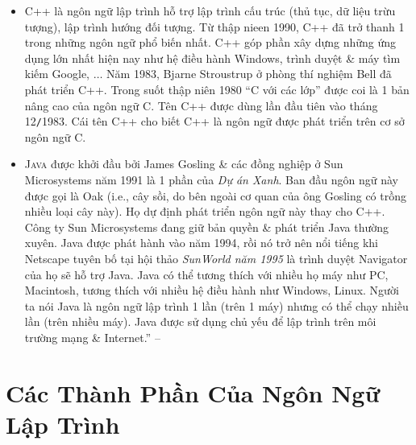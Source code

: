 \documentclass[oneside]{book}
\numberwithin{equation}{section}
\begin{document}
\begin{itemize}
	\item C++ là ngôn ngữ lập trình hỗ trợ lập trình cấu trúc (thủ tục, dữ liệu trừu tượng), lập trình hướng đối tượng. Từ thập nieen 1990, C++ đã trở thanh 1 trong những ngôn ngữ phổ biến nhất. C++ góp phần xây dựng những ứng dụng lớn nhất hiện nay như hệ điều hành Windows, trình duyệt \& máy tìm kiếm Google, $\ldots$ Năm 1983, Bjarne Stroustrup ở phòng thí nghiệm Bell đã phát triển C++. Trong suốt thập niên 1980 ``C với các lớp'' được coi là 1 bản nâng cao của ngôn ngữ C. Tên C++ được dùng lần đầu tiên vào tháng 12\texttt{/}1983. Cái tên C++ cho biết C++ là ngôn ngữ được phát triển trên cơ sở ngôn ngữ C.
	\item \textsc{Java} được khởi đầu bởi James Gosling \& các đồng nghiệp ở Sun Microsystems năm 1991 là 1 phần của \textit{Dự án Xanh}. Ban đầu ngôn ngữ này được gọi là Oak (i.e., cây sồi, do bên ngoài cơ quan của ông Gosling có trồng nhiều loại cây này). Họ dự định phát triển ngôn ngữ này thay cho C++. Công ty Sun Microsystems đang giữ bản quyền \& phát triển Java thường xuyên. Java được phát hành vào năm 1994, rồi nó trở nên nổi tiếng khi Netscape tuyên bố tại hội thảo \textit{SunWorld năm 1995} là trình duyệt Navigator của họ sẽ hỗ trợ Java. Java có thể tương thích với nhiều họ máy như PC, Macintosh, tương thích với nhiều hệ điều hành như Windows, Linux. Người ta nói Java là ngôn ngữ lập trình 1 lần (trên 1 máy) nhưng có thể chạy nhiều lần (trên nhiều máy). Java được sử dụng chủ yếu để lập trình trên môi trường mạng \& Internet.'' -- \cite[pp. 6--8]{SGK_Tin_Hoc_11}
\end{itemize}

\section{Các Thành Phần Của Ngôn Ngữ Lập Trình}
\end{document}
